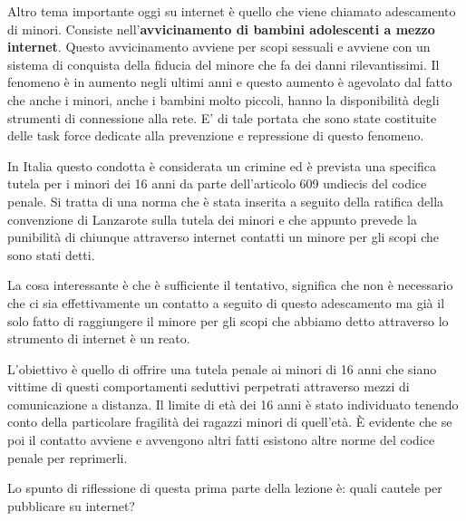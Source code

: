 Altro tema importante oggi su internet è quello che viene chiamato adescamento di minori. Consiste nell'\textbf{avvicinamento di bambini adolescenti a mezzo internet}. Questo avvicinamento avviene per scopi sessuali e avviene con un sistema di conquista della fiducia del minore che fa dei danni rilevantissimi. Il fenomeno è in aumento negli ultimi anni e questo aumento è agevolato dal fatto che anche i minori, anche i bambini molto piccoli, hanno la disponibilità degli strumenti di connessione alla rete. E' di tale portata che sono state costituite delle task force dedicate alla prevenzione e repressione di questo fenomeno.\par
In Italia questo condotta è considerata un crimine ed è prevista una specifica tutela per i minori dei 16 anni da parte dell'articolo 609 undiecis del codice penale. Si tratta di una norma che è stata inserita a seguito della ratifica della convenzione di Lanzarote sulla tutela dei minori e che appunto prevede la punibilità di chiunque attraverso internet contatti un minore per gli scopi che sono stati detti.\par
La cosa interessante è che è sufficiente il tentativo, significa che non è necessario che ci sia effettivamente un contatto a seguito di questo adescamento ma già il solo fatto di raggiungere il minore per gli scopi che abbiamo detto attraverso lo strumento di internet è un reato.\par
L'obiettivo è quello di offrire una tutela penale ai minori di 16 anni che siano vittime di questi comportamenti seduttivi perpetrati attraverso mezzi di comunicazione a distanza. Il limite di età dei 16 anni è stato individuato tenendo conto della particolare fragilità dei ragazzi minori di quell'età. È evidente che se poi il contatto avviene e avvengono altri fatti esistono altre norme del codice penale per reprimerli.\par
Lo spunto di riflessione di questa prima parte della lezione è: quali cautele per pubblicare su internet?

